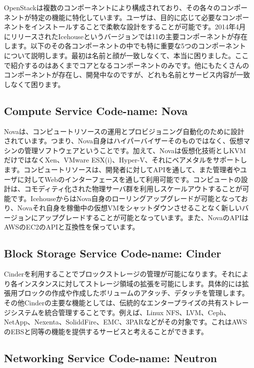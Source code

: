\documentclass[8pt,b5paper,tombo,openany]{jsbook}
\begin{document}
OpenStackは複数のコンポーネントにより構成されており、その各々のコンポーネントが特定の機能に特化しています。ユーザは、目的に応じて必要なコンポーネントをインストールすることで柔軟な設計をすることが可能です。2014年4月にリリースされたIcehouseというバージョンでは11の主要コンポーネントが存在します。以下のその各コンポーネントの中でも特に重要な5つのコンポーネントについて説明します。最初は名前と顔が一致しなくて、本当に困りました。ここで紹介するのはあくまでコアとなるコンポーネントのみです。他にもたくさんのコンポーネントが存在し、開発中なのですが、どれも名前とサービス内容が一致しなくて困ります。

\subsection{Compute Service Code-name: Nova}

Novaは、コンピュートリソースの運用とプロビジョニング自動化のために設計されています。つまり、Nova自身はハイパーバイザーそのものではなく、仮想マシンの管理ソフトウェアということです。加えて、Novaは仮想化技術としKVMだけではなくXen、VMware ESX(i)、Hyper-V、それにベアメタルをサポートします。コンピュートリソースは、開発者に対してAPIを通して、また管理者やユーザに対してWebのインターフェースを通して利用可能です。コンピュートの設計は、コモディティ化された物理サーバ群を利用しスケールアウトすることが可能です。IcehouseからはNova自身のローリングアップグレードが可能となっており、Novaそれ自身を稼働中の仮想VMをシャットダウンさせることなく新しいバージョンにアップグレードすることが可能となっています。また、NovaのAPIはAWSのEC2のAPIと互換性を保っています。

\subsection{Block Storage Service Code-name: Cinder}

Cinderを利用することでブロックストレージの管理が可能になります。それにより各インスタンスに対してストレージ領域の拡張を可能にします。具体的には拡張用ブロックの作成や作成したボリュームのアタッチ、デタッチを管理します。その他Cinderの主要な機能としては、伝統的なエンタープライズの共有ストレージシステムを統合管理することです。例えば、Linux NFS、LVM、Ceph、NetApp、Nexenta、SoliddFire、EMC、3PARなどがその対象です。これはAWSのEBSと同等の機能を提供するサービスと考えることができます。

\subsection{Networking Service Code-name: Neutron}
\end{document}
